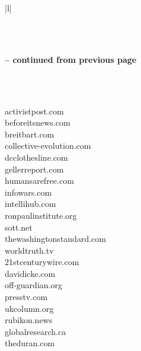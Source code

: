 \documentclass[12pt]{article}
\begin{document}
\begin{center}
\begin{longtable}{|l|}
\caption{Domains that are present in both D2 and D3 (gotten from finalB.csv)} \label{tab:long} \\

\hline {}  \\ \hline 
\endfirsthead

%
{{\bfseries \tablename \thetable{} -- continued from previous page}} \\
\hline  {}  \\ \hline 
\endhead

\hline {} \\ \hline
\endfoot

\hline \hline
\endlastfoot
activistpost.com          \\
beforeitsnews.com         \\
breitbart.com             \\
collective-evolution.com  \\
dcclothesline.com         \\
gellerreport.com          \\
humansarefree.com         \\
infowars.com              \\
intellihub.com            \\
ronpaulinstitute.org      \\
sott.net                  \\
thewashingtonstandard.com \\
worldtruth.tv             \\
21stcenturywire.com       \\
davidicke.com             \\
off-guardian.org          \\
presstv.com               \\
ukcolumn.org              \\
rubikon.news              \\
globalresearch.ca         \\
theduran.com 
\end{longtable}
\end{center}
\end{document}
